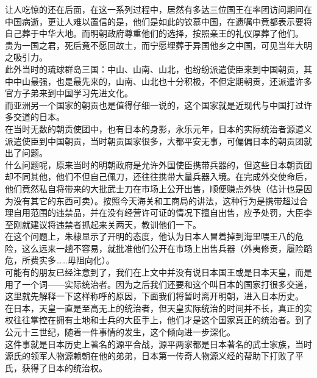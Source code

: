 \begin{multicols}{\theparacolNo}
让人吃惊的还在后面，在这一系列过程中，居然有多达三位国王在率团访问期间在中国病逝，更让人难以置信的是，他们是如此的钦慕中国，在遗嘱中竟都表示要将自己葬于中华大地。而明朝政府尊重他们的选择，按照亲王的礼仪厚葬了他们。\\

贵为一国之君，死后竟不愿回故土，而宁愿埋葬于异国他乡之中国，可见当年大明之吸引力。\\

此外当时的琉球群岛三国：中山、山南、山北，也纷纷派遣使臣来到中国朝贡，其中中山最强，也是最先来的，山南、山北也十分积极，不但定期朝贡，还派遣许多官方子弟来到中国学习先进文化。\\

而亚洲另一个国家的朝贡也是值得仔细一说的，这个国家就是近现代与中国打过许多交道的日本。\\

在当时无数的朝贡使团中，也有日本的身影，永乐元年，日本的实际统治者源道义派遣使臣到中国朝贡，当时朝贡国家很多，大都平安无事，可偏偏日本的朝贡团就出了问题。\\

什么问题呢，原来当时的明朝政府是允许外国使臣携带兵器的，但这些日本朝贡团却不同其他，他们不但自己佩刀，还往往携带大量兵器入境。在完成外交使命后，他们竟然私自将带来的大批武士刀在市场上公开出售，顺便赚点外快（估计也是因为没有其它的东西可卖）。按照今天海关和工商局的讲法，这种行为是携带超过合理自用范围的违禁品，并在没有经营许可证的情况下擅自出售，应予处罚，大臣李至刚就建议将违禁者抓起来关两天，教训他们一下。\\

在这个问题上，朱棣显示了开明的态度，他认为日本人冒着掉到海里喂王八的危险，这么远来一趟不容易，就批准他们公开在市场上出售兵器（外夷修贡，履险蹈危，所费实多……毋阻向化）。\\

可能有的朋友已经注意到了，我们在上文中并没有说日本国王或是日本天皇，而是用了一个词——实际统治者。因为之后我们还要和这个叫日本的国家打很多交道，这里就先解释一下这样称呼的原因，下面我们将暂时离开明朝，进入日本历史。\\

在日本，天皇一直是至高无上的统治者，但天皇实际统治的时间并不长，真正的实权往往掌控在拥有土地和士兵的大臣手上，他们才是这个国家真正的统治者。到了公元十三世纪，随着一件事情的发生，这个倾向进一步深化。\\

这件事就是日本历史上著名的源平合战，源平两家都是日本著名的武士家族，当时源氏的领军人物源赖朝在他的弟弟，日本第一传奇人物源义经的帮助下打败了平氏，获得了日本的统治权。\\


\end{multicols}
